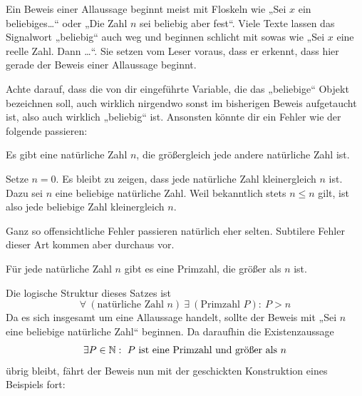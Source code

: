   
\begin{bem}[Signalwörter]
    Ein Beweis einer Allaussage beginnt meist mit Floskeln wie „Sei $x$ ein beliebiges\dots“ oder „Die Zahl $n$ sei beliebig aber fest“. Viele Texte lassen das Signalwort „beliebig“ auch weg und beginnen schlicht mit sowas wie „Sei $x$ eine reelle Zahl. Dann \dots“. Sie setzen vom Leser voraus, dass er erkennt, dass hier gerade der Beweis einer Allaussage beginnt.
\end{bem}
  
 
\begin{bem}[*]
    Achte darauf, dass die von dir eingeführte Variable, die das „beliebige“ Objekt bezeichnen soll, auch wirklich nirgendwo sonst im bisherigen Beweis aufgetaucht ist, also auch wirklich „beliebig“ ist. Ansonsten könnte dir ein Fehler wie der folgende passieren:
    \begin{bsp}[*]
        Es gibt eine natürliche Zahl $n$, die größergleich jede andere natürliche Zahl ist.
    \end{bsp}
    \begin{bew}
        Setze $n=0$. Es bleibt zu zeigen, dass jede natürliche Zahl kleinergleich $n$ ist. Dazu sei $n$ eine beliebige natürliche Zahl. Weil bekanntlich stets $n\le n$ gilt, ist also jede beliebige Zahl kleinergleich $n$.
    \end{bew}
        Ganz so offensichtliche Fehler passieren natürlich eher selten. Subtilere Fehler dieser Art kommen aber durchaus vor.
\end{bem}


\begin{bsp} \label{euklid}
    Für jede natürliche Zahl $n$ gibt es eine Primzahl, die größer als $n$ ist.
\end{bsp}


\begin{bem}
    Die logische Struktur dieses Satzes ist
        \[ \forall\ (\text{natürliche Zahl $n$})\ \exists\ (\text{Primzahl $P$}):\ P>n \]
    Da es sich insgesamt um eine Allaussage handelt, sollte der Beweis mit „Sei $n$ eine beliebige natürliche Zahl“ beginnen. Da daraufhin die Existenzaussage
        \[ \exists P\in \mathbb N:\ \text{$P$ ist eine Primzahl und größer als $n$} \]
    übrig bleibt, fährt der Beweis nun mit der geschickten Konstruktion eines Beispiels fort:
\end{bem}


